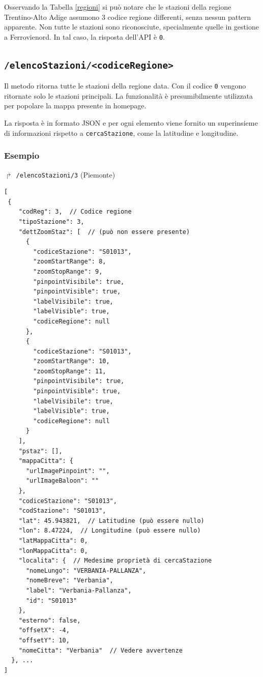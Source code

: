 \documentclass[12pt,italian]{report}
\begin{document}
Osservando la Tabella \ref{regioni} si può notare che le stazioni
della regione Trentino-Alto Adige assumono 3 codice regione
differenti, senza nessun pattern apparente.  Non tutte le stazioni
sono riconosciute, specialmente quelle in gestione a Ferrovienord.  In
tal caso, la risposta dell'API è \texttt{0}.

\subsection{\texttt{/elencoStazioni/<codiceRegione>}}
\label{elencoStazioni}

Il metodo ritorna tutte le stazioni della regione data.  Con il codice
\texttt{0} vengono ritornate solo le stazioni principali.  La
funzionalità è presumibilmente utilizzata per popolare la mappa
presente in homepage.

La risposta è in formato JSON e per ogni elemento viene fornito un
superinsieme di informazioni rispetto a \texttt{cercaStazione}, come
la latitudine e longitudine.

\subsubsection{Esempio}

$\Rsh$ \texttt{/elencoStazioni/3} \hfill (Piemonte)
\begin{verbatim}
[
 {
    "codReg": 3,  // Codice regione
    "tipoStazione": 3,
    "dettZoomStaz": [  // (può non essere presente)
      {
        "codiceStazione": "S01013",
        "zoomStartRange": 8,
        "zoomStopRange": 9,
        "pinpointVisibile": true,
        "pinpointVisible": true,
        "labelVisibile": true,
        "labelVisible": true,
        "codiceRegione": null
      },
      {
        "codiceStazione": "S01013",
        "zoomStartRange": 10,
        "zoomStopRange": 11,
        "pinpointVisibile": true,
        "pinpointVisible": true,
        "labelVisibile": true,
        "labelVisible": true,
        "codiceRegione": null
      }
    ],
    "pstaz": [],
    "mappaCitta": {
      "urlImagePinpoint": "",
      "urlImageBaloon": ""
    },
    "codiceStazione": "S01013",
    "codStazione": "S01013",
    "lat": 45.943821,  // Latitudine (può essere nullo)
    "lon": 8.47224,  // Longitudine (può essere nullo)
    "latMappaCitta": 0,
    "lonMappaCitta": 0,
    "localita": {  // Medesime proprietà di cercaStazione
      "nomeLungo": "VERBANIA-PALLANZA",
      "nomeBreve": "Verbania",
      "label": "Verbania-Pallanza",
      "id": "S01013"
    },
    "esterno": false,
    "offsetX": -4,
    "offsetY": 10,
    "nomeCitta": "Verbania"  // Vedere avvertenze
  }, ...
]
\end{verbatim}
\end{document}
